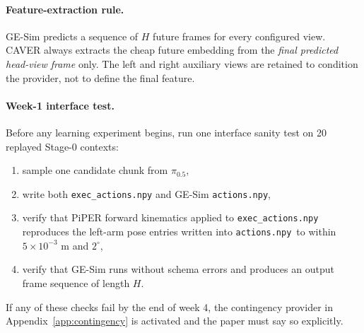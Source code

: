 \documentclass[10pt]{article}
\theoremstyle{plain}
\theoremstyle{definition}
\theoremstyle{remark}
\begin{document}
\paragraph{Feature-extraction rule.}
GE-Sim predicts a sequence of $H$ future frames for every configured view. CAVER always extracts the cheap future embedding from the \emph{final predicted head-view frame} only. The left and right auxiliary views are retained to condition the provider, not to define the final feature.

\paragraph{Week-1 interface test.}
Before any learning experiment begins, run one interface sanity test on 20 replayed Stage-0 contexts:
\begin{enumerate}
    \item sample one candidate chunk from $\pi_{0.5}$,
    \item write both \texttt{exec\_actions.npy} and GE-Sim \texttt{actions.npy},
    \item verify that PiPER forward kinematics applied to \texttt{exec\_actions.npy} reproduces the left-arm pose entries written into \texttt{actions.npy}$\,$ to within $5\times10^{-3}$ m and $2^\circ$,
    \item verify that GE-Sim runs without schema errors and produces an output frame sequence of length $H$.
\end{enumerate}
If any of these checks fail by the end of week 4, the contingency provider in Appendix~\ref{app:contingency} is activated and the paper must say so explicitly.
\end{document}
